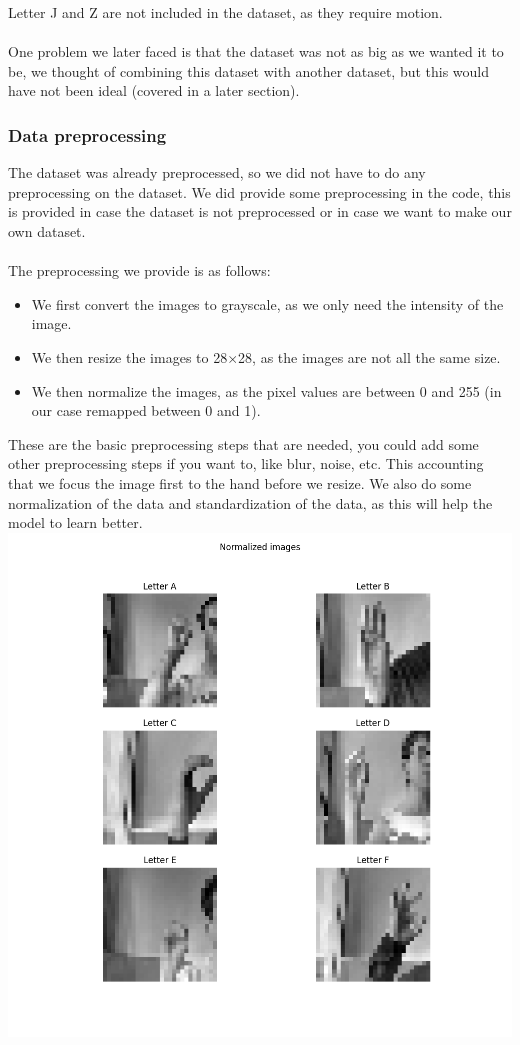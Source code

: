 \documentclass[../paper.tex]{subfiles}
\begin{document}
    Letter J and Z are not included in the dataset, as they require motion.\\
    \\
    One problem we later faced is that the dataset was not as big as we wanted it to be,
    we thought of combining this dataset with another dataset, but this would have not been ideal (covered in a later section).

    \subsubsection{Data preprocessing}
    The dataset was already preprocessed, so we did not have to do any preprocessing on the dataset. 
    We did provide some preprocessing in the code, this is provided in case the dataset is not preprocessed or in case we want to make our own dataset.\\
    \\
    The preprocessing we provide is as follows:
    \begin{itemize}
        \item We first convert the images to grayscale, as we only need the intensity of the image.
        \item We then resize the images to 28$\times$28, as the images are not all the same size.
        \item We then normalize the images, as the pixel values are between 0 and 255 (in our case remapped between 0 and 1).
    \end{itemize}
    These are the basic preprocessing steps that are needed, you could add some other preprocessing steps if you want to, like blur, noise, etc.
    This accounting that we focus the image first to the hand before we resize.
    We also do some normalization of the data and standardization of the data, as this will help the model to learn better.
    \includegraphics[width=\linewidth]{letters_grid_normalized_6}
\end{document}
